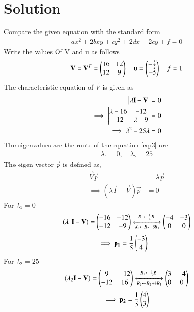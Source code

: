 \documentclass[journal,12pt,twocolumn]{IEEEtran}
\begin{document}
\section{Solution}
Compare the given equation with the standard form
\begin{align}\label{eq:1}
    ax^2+2bxy+cy^2+2dx+2ey+f = 0
\end{align}
Write the values Of V and u as follows
\begin{align}
    \mathbf{V} = \mathbf{V}^T = \begin{pmatrix}16 & 12\\12 & 9\end{pmatrix} \quad
    \mathbf{u} =\begin{pmatrix}-\frac{5}{2} \\ -5\end{pmatrix} \quad
     f = 1 \label{eq:2}
\end{align}
The characteristic equation of $\vec{V}$ is given as
\begin{align}
    \begin{vmatrix}\lambda\mathbf{I}-\mathbf{V}\end{vmatrix} = 0\\
    \implies \begin{vmatrix}\lambda-16 & -12 \\ -12 & \lambda-9\end{vmatrix} = 0\\
    \implies \lambda^2 -25\lambda = 0 \label{eq:3}
\end{align}
The eigenvalues are the roots of the equation \eqref{eq:3} are
\begin{align}
    \lambda_{1} = 0, \quad \lambda_{2} = 25 \label{eq:4}
\end{align}
The eigen vector $\vec{p}$ is defined as, 
\begin{align}
    \vec{V}\vec{p} &= \lambda\vec{p}\\
    \implies(\lambda\vec{I}-\vec{V})\vec{p}&=0
\end{align}
For $\lambda_1=0$
\begin{align}
    (\lambda_1\mathbf{I}-\mathbf{V}) = \begin{pmatrix}-16 & -12\\-12 & -9\end{pmatrix}\xleftrightarrow[R_2\leftarrow R_2-3R_1]{R_1\leftarrow \frac{1}{4}R_1}\begin{pmatrix}-4 & -3\\0 & 0\end{pmatrix}
\end{align}
\begin{align}
    \implies\mathbf{p_1}&=\frac{1}{5}\begin{pmatrix}-3\\4\end{pmatrix}\label{eq:p1val}
\end{align}
For $\lambda_2=25$
\begin{align}
    (\lambda_2\mathbf{I}-\mathbf{V}) = \begin{pmatrix}9 & -12\\-12 & 16\end{pmatrix}\xleftrightarrow[R_2\leftarrow R_2+4R_1]{R_1\leftarrow \frac{1}{3}R_1}\begin{pmatrix}3 & -4\\0 & 0\end{pmatrix}
\end{align}
\begin{align}
    \implies\mathbf{p_2}=\frac{1}{5}\begin{pmatrix}4\\3\end{pmatrix}\label{eq:p2val}
\end{align}
\end{document}
